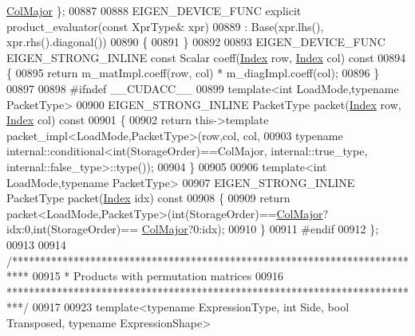 \begin{DoxyCode}
      \hyperlink{group__enums_ggaacded1a18ae58b0f554751f6cdf9eb13a0cbd4bdd0abcfc0224c5fcb5e4f6669a}{ColMajor} \};
00887 
00888   EIGEN\_DEVICE\_FUNC \textcolor{keyword}{explicit} product\_evaluator(\textcolor{keyword}{const} XprType& xpr)
00889     : Base(xpr.lhs(), xpr.rhs().diagonal())
00890   \{
00891   \}
00892   
00893   EIGEN\_DEVICE\_FUNC EIGEN\_STRONG\_INLINE \textcolor{keyword}{const} Scalar coeff(\hyperlink{namespace_eigen_a62e77e0933482dafde8fe197d9a2cfde}{Index} row, \hyperlink{namespace_eigen_a62e77e0933482dafde8fe197d9a2cfde}{Index} col)\textcolor{keyword}{ const}
00894 \textcolor{keyword}{  }\{
00895     \textcolor{keywordflow}{return} m\_matImpl.coeff(row, col) * m\_diagImpl.coeff(col);
00896   \}
00897   
00898 \textcolor{preprocessor}{#ifndef \_\_CUDACC\_\_}
00899   \textcolor{keyword}{template}<\textcolor{keywordtype}{int} LoadMode,\textcolor{keyword}{typename} PacketType>
00900   EIGEN\_STRONG\_INLINE PacketType packet(\hyperlink{namespace_eigen_a62e77e0933482dafde8fe197d9a2cfde}{Index} row, \hyperlink{namespace_eigen_a62e77e0933482dafde8fe197d9a2cfde}{Index} col)\textcolor{keyword}{ const}
00901 \textcolor{keyword}{  }\{
00902     \textcolor{keywordflow}{return} this->\textcolor{keyword}{template} packet\_impl<LoadMode,PacketType>(row,col, col,
00903                                  \textcolor{keyword}{typename} internal::conditional<int(StorageOrder)==ColMajor,
       internal::true\_type, internal::false\_type>::type());
00904   \}
00905   
00906   \textcolor{keyword}{template}<\textcolor{keywordtype}{int} LoadMode,\textcolor{keyword}{typename} PacketType>
00907   EIGEN\_STRONG\_INLINE PacketType packet(\hyperlink{namespace_eigen_a62e77e0933482dafde8fe197d9a2cfde}{Index} idx)\textcolor{keyword}{ const}
00908 \textcolor{keyword}{  }\{
00909     \textcolor{keywordflow}{return} packet<LoadMode,PacketType>(int(StorageOrder)==\hyperlink{group__enums_ggaacded1a18ae58b0f554751f6cdf9eb13a0cbd4bdd0abcfc0224c5fcb5e4f6669a}{ColMajor}?idx:0,int(StorageOrder)==
      \hyperlink{group__enums_ggaacded1a18ae58b0f554751f6cdf9eb13a0cbd4bdd0abcfc0224c5fcb5e4f6669a}{ColMajor}?0:idx);
00910   \}
00911 \textcolor{preprocessor}{#endif}
00912 \};
00913 
00914 \textcolor{comment}{/***************************************************************************}
00915 \textcolor{comment}{* Products with permutation matrices}
00916 \textcolor{comment}{***************************************************************************/}
00917 
00923 \textcolor{keyword}{template}<\textcolor{keyword}{typename} ExpressionType, \textcolor{keywordtype}{int} S\textcolor{keywordtype}{id}e, \textcolor{keywordtype}{bool} Transposed, \textcolor{keyword}{typename} ExpressionShape>

\end{DoxyCode}
